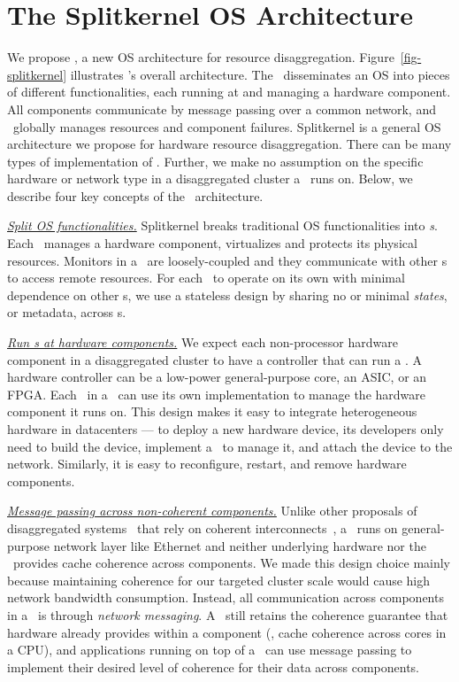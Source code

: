 \section{The Splitkernel OS Architecture}

We propose {\em \splitkernel}, a new OS architecture for resource disaggregation. 
Figure~\ref{fig-splitkernel} illustrates \splitkernel's overall architecture.
The \splitkernel\ disseminates an OS into pieces of different functionalities,
each running at and managing a hardware component.
All components communicate by message passing over a common network,
and \splitkernel\ globally manages resources and component failures.
Splitkernel is a general OS architecture we propose for hardware resource disaggregation.
There can be many types of implementation of \splitkernel.
Further, we make no assumption on the specific hardware or network type in a disaggregated cluster a \splitkernel\ runs on.
Below, we describe four key concepts of the \splitkernel\ architecture.

\textit{\uline{Split OS functionalities.}}
Splitkernel breaks traditional OS functionalities into {\em \microos{}s}.
Each \microos\ manages a hardware component, virtualizes and protects its physical resources.
Monitors in a \splitkernel\ are loosely-coupled and 
they communicate with other \microos{}s to access remote resources. 
For each \microos\ to operate on its own with minimal dependence on other \microos{}s,
we use a stateless design by sharing no or minimal {\em states}, or metadata,
across \microos{}s.

\textit{\uline{Run \microos{}s at hardware components.}}
We expect each non-processor hardware component in a disaggregated cluster to have a controller that 
can run a \microos.
A hardware controller can be a low-power general-purpose core, an ASIC, or an FPGA.
Each \microos\ in a \splitkernel\ can use its own implementation to manage the hardware component it runs on.
This design makes it easy to integrate heterogeneous hardware in datacenters ---
to deploy a new hardware device, its developers only need to build the device,
implement a \microos\ to manage it, %
and attach the device to the network. 
Similarly, it is easy to reconfigure, restart, and remove hardware components.

\textit{\uline{Message passing across non-coherent components.}}
Unlike other proposals of disaggregated systems~\cite{HP-TheMachine} that rely on coherent interconnects~\cite{GenZ,ccix,OpenCAPI},
a \splitkernel\ runs on general-purpose network layer like Ethernet and 
neither underlying hardware nor the \splitkernel\ provides cache coherence across components.
We made this design choice mainly because maintaining coherence for our targeted cluster scale 
would cause high network bandwidth consumption.
Instead, all communication across components in a \splitkernel\ is through {\em network messaging}.
A \splitkernel\ still retains the coherence guarantee that hardware already provides within a component (\eg, cache coherence across cores in a CPU),
and applications running on top of a \splitkernel\ can use message passing to implement their desired level of coherence for their data across components.

